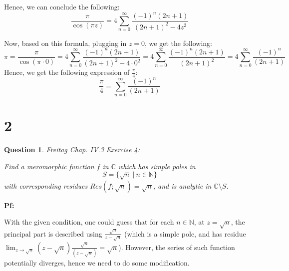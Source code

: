 \documentclass{article}
\newtheorem{question}{Question}
\begin{document}
Hence, we can conclude the following:
$$\frac{\pi}{\cos(\pi z)}=4\sum_{n=0}^{\infty}\frac{(-1)^n(2n+1)}{(2n+1)^2-4z^2}$$

\hfil

Now, based on this formula, plugging in $z=0$, we get the following:
$$\pi =\frac{\pi}{\cos(\pi \cdot 0)}=4\sum_{n=0}^{\infty}\frac{(-1)^n(2n+1)}{(2n+1)^2-4\cdot 0^2} = 4\sum_{n=0}^{\infty}\frac{(-1)^n(2n+1)}{(2n+1)^2}=4\sum_{n=0}^{\infty}\frac{(-1)^n}{(2n+1)}$$
Hence, we get the following expression of $\frac{\pi}{4}$:
$$\frac{\pi}{4}=\sum_{n=0}^{\infty}\frac{(-1)^n}{(2n+1)}$$

\break

\section*{2}
\begin{myBox}[]{}
    \begin{question}
        Freitag Chap. IV.3 Exercise 4:

        Find a meromorphic function $f$ in $\mathbb{C}$ which has simple poles in 
        $$S=\{\sqrt{n}\ |\ n\in\mathbb{N}\}$$
        with corresponding residues $Res(f;\sqrt{n})=\sqrt{n}$, and is analytic in $\mathbb{C}\setminus S$.
    \end{question}
\end{myBox}

\textbf{Pf:}

With the given condition, one could guess that for each $n\in\mathbb{N}$, at $z=\sqrt{n}$, the principal part is described using $\frac{\sqrt{n}}{z-\sqrt{n}}$ (which is a simple pole, and has residue $\lim_{z\rightarrow\sqrt{n}}(z-\sqrt{n})\frac{\sqrt{n}}{(z-\sqrt{n})}=\sqrt{n}$). 
However, the series of such function potentially diverges, hence we need to do some modification.

\hfil
\end{document}
